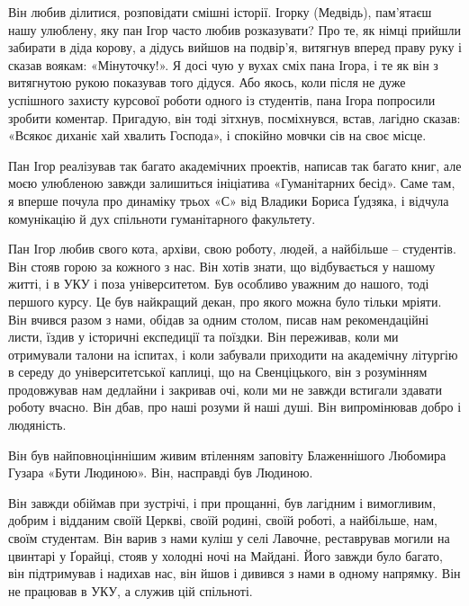 Він любив ділитися, розповідати смішні історії. Ігорку (Медвідь), пам’ятаєш
нашу улюблену, яку пан Ігор часто любив розказувати?  Про те, як німці прийшли
забирати в діда корову, а дідусь вийшов на подвір’я, витягнув вперед праву руку
і сказав воякам: «Мінуточку!». Я досі чую у вухах сміх пана Ігора, і те як він
з витягнутою рукою показував того дідуся. Або якось, коли після не дуже
успішного захисту курсової роботи одного із студентів, пана Ігора попросили
зробити коментар. Пригадую, він тоді зітхнув, посміхнувся, встав, лагідно
сказав: «Всякоє диханіє хай хвалить Господа», і спокійно мовчки сів на своє
місце.

Пан Ігор реалізував так багато академічних проектів, написав так багато книг,
але моєю улюбленою завжди залишиться ініціатива «Гуманітарних бесід». Саме там,
я вперше почула про динаміку трьох «С» від Владики Бориса Ґудзяка, і відчула
комунікацію й дух спільноти гуманітарного факультету.

Пан Ігор любив свого кота, архіви, свою роботу, людей, а найбільше – студентів.
Він стояв горою за кожного з нас. Він хотів знати, що відбувається у нашому
житті, і в УКУ і поза університетом. Був особливо уважним до нашого, тоді
першого курсу. Це був найкращий декан, про якого можна було тільки мріяти. Він
вчився разом з нами, обідав за одним столом, писав нам рекомендаційні листи,
їздив у історичні експедиції та поїздки. Він переживав, коли ми отримували
талони на іспитах, і коли забували приходити на академічну літургію в середу до
університетської каплиці, що на Свенціцького, він з розумінням продовжував нам
дедлайни і закривав очі, коли ми не завжди встигали здавати роботу вчасно. Він
дбав, про наші розуми й наші душі. Він випромінював добро і людяність. 

Він був найповноціннішим живим втіленням заповіту Блаженнішого Любомира Гузара
«Бути Людиною». Він, насправді був Людиною.

Він завжди обіймав при зустрічі, і при прощанні, був лагідним і вимогливим,
добрим і відданим своїй Церкві, своїй родині, своїй роботі, а найбільше, нам,
своїм студентам. Він варив з нами куліш у селі Лавочне, реставрував могили на
цвинтарі у Ґорайці, стояв у холодні ночі на Майдані. Його завжди було багато,
він підтримував і надихав нас, він йшов і дивився з нами в одному напрямку. Він
не працював в УКУ, а служив цій спільноті.


